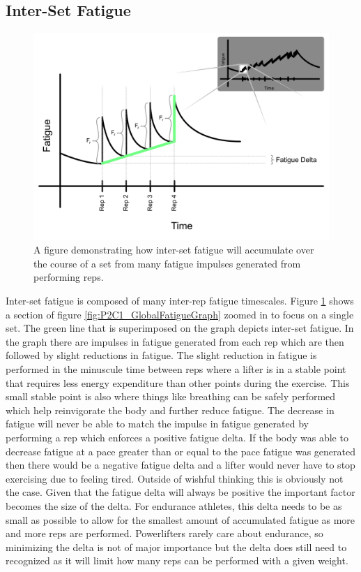 \subsection{Inter-Set Fatigue}
\label{sec:P2C1_InterSetFatigue}

\begin{figure}[htb]
    \centering
    \includegraphics[scale=0.55]{images/p2/ch1/InterSetFatigue.png}
    \caption{A figure demonstrating how inter-set fatigue will accumulate over the course of a set from many fatigue impulses generated from performing reps.}
    \label{fig:P2C1_InterSetFatigue}
\end{figure}

Inter-set fatigue is composed of many inter-rep fatigue timescales. Figure \ref{fig:P2C1_InterSetFatigue} shows a section of figure \ref{fig:P2C1_GlobalFatigueGraph} zoomed in to focus on a single set. The green line that is superimposed on the graph depicts inter-set fatigue. In the graph there are impulses in fatigue generated from each rep which are then followed by slight reductions in fatigue. The slight reduction in fatigue is performed in the minuscule time between reps where a lifter is in a stable point that requires less energy expenditure than other points during the exercise. This small stable point is also where things like breathing can be safely performed which help reinvigorate the body and further reduce fatigue. The decrease in fatigue will never be able to match the impulse in fatigue generated by performing a rep which enforces a positive fatigue delta. If the body was able to decrease fatigue at a pace greater than or equal to the pace fatigue was generated then there would be a negative fatigue delta and a lifter would never have to stop exercising due to feeling tired. Outside of wishful thinking this is obviously not the case. Given that the fatigue delta will always be positive the important factor becomes the size of the delta. For endurance athletes, this delta needs to be as small as possible to allow for the smallest amount of accumulated fatigue as more and more reps are performed. Powerlifters rarely care about endurance, so minimizing the delta is not of major importance but the delta does still need to recognized as it will limit how many reps can be performed with a given weight.

